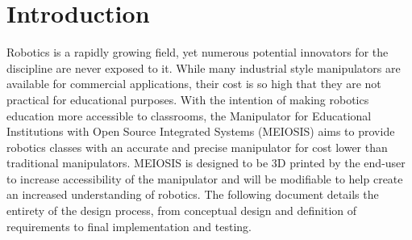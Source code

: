 \section{Introduction}
Robotics is a rapidly growing field, yet numerous potential innovators for the discipline are never exposed to it. While many industrial style manipulators are available for commercial applications, their cost is so high that they are not practical for educational purposes. With the intention of making robotics education more accessible to classrooms, the Manipulator for Educational Institutions with Open Source Integrated Systems (MEIOSIS) aims to provide robotics classes with an accurate and precise manipulator for cost lower than traditional manipulators. MEIOSIS is designed to be 3D printed by the end-user to increase accessibility of the manipulator and will be modifiable to help create an increased understanding of robotics. The following document details the entirety of the design process, from conceptual design and definition of requirements to final implementation and testing.
